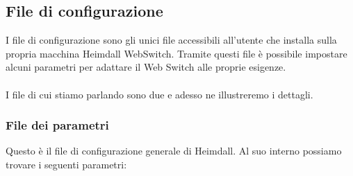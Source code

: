 \documentclass[italian]{tktltiki2}
\begin{document}
\subsection{File di configurazione}
\label{ssec:config}
I file di configurazione sono gli unici file accessibili all'utente che installa sulla propria macchina Heimdall WebSwitch. Tramite questi file è possibile impostare alcuni parametri per adattare il Web Switch alle proprie esigenze.
\\
\\
I file di cui stiamo parlando sono due e adesso ne illustreremo i dettagli.
\subsubsection{File dei parametri}
\label{sec:config_parser}
Questo è il file di configurazione generale di Heimdall. Al suo interno possiamo trovare i seguenti parametri:
\end{document}

